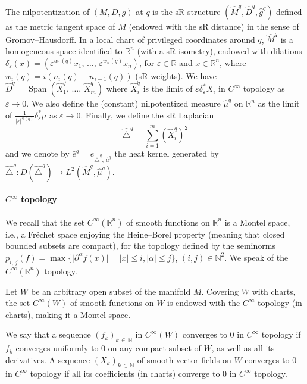 \documentclass[AHL,Unicode,published]{cedram}
\newcommand*\R{\mathbb{R}}
\newcommand*\N{\mathbb{N}}
\newcommand{\calQ}{\mathcal{Q}}
\DeclareMathOperator{\Span}{Span}
\renewcommand{\leq}{\leqslant}
\begin{document}
The nilpotentization of $(M,D,g)$ at $q$ is the sR structure $(\widehat{M}^{q},\widehat{D}^{q},\widehat{g}^{q})$ defined as the metric tangent space of $M$ (endowed with the sR distance) in the sense of Gromov--Hausdorff. In a local chart of privileged coordinates around $q$, $\widehat{M}^{q}$ is a homogeneous space identified to $\R^n$ (with a sR isometry), endowed with dilations $\delta_\varepsilon(x) = (\varepsilon^{w_1(q)} x_1,\,\ldots,\, \varepsilon^{w_n(q)} x_n )$, for $\varepsilon\in\R$ and $x\in\R^n$, where $w_i(q)=i(n_i(q)-n_{i-1}(q))$ (sR weights). We have $\widehat{D}^{q}=\Span(\widehat{X}_1^{q},\,\ldots,\,\widehat{X}_m^{q})$ where $\widehat{X}_i^{q}$ is the limit of $\varepsilon\delta_\varepsilon^*X_i$ in $C^\infty$ topology as $\varepsilon\rightarrow 0$. We also define the (constant) nilpotentized measure $\widehat{\mu}^{q}$ on $\R^n$ as the limit of $\frac{1}{\vert\varepsilon\vert^{\calQ(q)}} \delta_\varepsilon^* \mu$ as $\varepsilon\rightarrow 0$. Finally, we define the sR Laplacian
\[
\widehat{\triangle}^{q} = \sum_{i=1}^m (\widehat{X}^{q}_i)^2
\]
and we denote by $\widehat{e}^{q} = e_{\widehat{\triangle}^{q},\,\widehat{\mu}^{q}}$ the heat kernel generated by $\widehat{\triangle}^{q}:D(\widehat{\triangle}^{q})\rightarrow L^2(\widehat M^{q},\widehat\mu^{q})$.

\goodbreak
\paragraph{$C^\infty$ topology}
We recall that the set $C^\infty(\R^n)$ of smooth functions on $\R^n$ is a Montel space, i.e., a Fréchet space enjoying the Heine--Borel property (meaning that closed bounded subsets are compact), for the topology defined by the seminorms $p_{i,\,j}(f) = \max \{ \vert \partial^\alpha f(x)\vert\ \mid\ \vert x\vert\leq i, \vert\alpha\vert\leq j\}$, $(i,j)\in\N^2$. We speak of the $C^\infty(\R^n)$ topology.

Let $W$ be an arbitrary open subset of the manifold $M$. Covering $W$ with charts, the set $C^\infty(W)$ of smooth functions on $W$ is endowed with the $C^\infty$ topology (in charts), making it a Montel space.

We say that a sequence $(f_k)_{k\,\in\,\N}$ in $C^\infty(W)$ converges to $0$ in $C^\infty$ topology if $f_k$ converges uniformly to $0$ on any compact subset of $W$, as well as all its derivatives. A sequence $(X_k)_{k\,\in\,\N}$ of smooth vector fields on $W$ converges to $0$ in $C^\infty$ topology if all its coefficients (in charts) converge to $0$ in $C^\infty$ topology.
\end{document}
